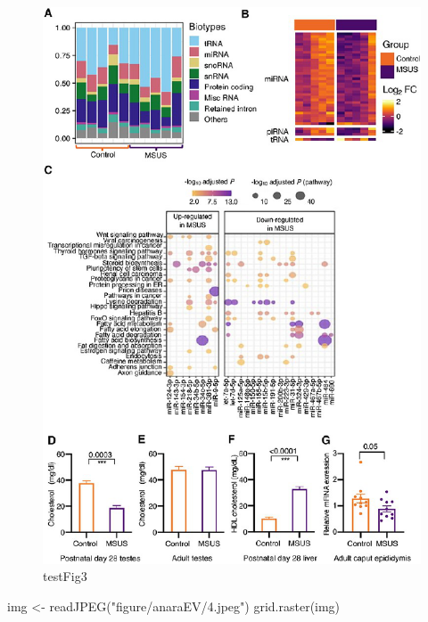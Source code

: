 \documentclass[12pt,twoside]{reedthesis}
\newenvironment{Shaded}{\begin{snugshade}}{\end{snugshade}}
\newcommand{\FunctionTok}[1]{\textcolor[rgb]{0.00,0.00,0.00}{#1}}
\newcommand{\NormalTok}[1]{#1}
\newcommand{\OtherTok}[1]{\textcolor[rgb]{0.56,0.35,0.01}{#1}}
\newcommand{\StringTok}[1]{\textcolor[rgb]{0.31,0.60,0.02}{#1}}
\begin{document}
\begin{figure}[H]

{\centering \includegraphics{thesis_files/figure-latex/fig3-1} 

}

\caption{testFig3}\label{fig:fig3}
\end{figure}
\begin{Shaded}
\begin{Highlighting}[]
\NormalTok{img }\OtherTok{\textless{}{-}} \FunctionTok{readJPEG}\NormalTok{(}\StringTok{"figure/anaraEV/4.jpeg"}\NormalTok{)}
\FunctionTok{grid.raster}\NormalTok{(img)}
\end{Highlighting}
\end{Shaded}
\end{document}
